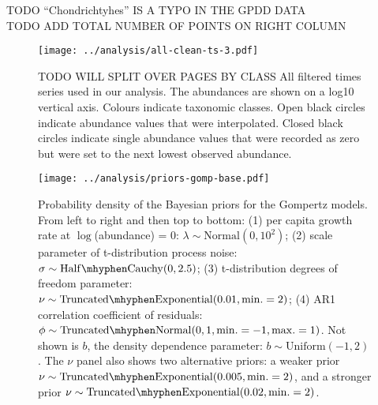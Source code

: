 
\clearpage
\renewcommand{\thetable}{S\arabic{table}}
\setcounter{table}{0}
TODO ``Chondrichtyhes'' IS A TYPO IN THE GPDD DATA\\
TODO ADD TOTAL NUMBER OF POINTS ON RIGHT COLUMN

\clearpage


\renewcommand{\thefigure}{S\arabic{figure}}
\setcounter{figure}{0}

\begin{figure}[htbp]
\begin{center}
\texttt{[image: ../analysis/all-clean-ts-3.pdf]}
\caption{
TODO WILL SPLIT OVER PAGES BY CLASS
  All filtered times series used in our analysis. The abundances are shown on
  a log10 vertical axis. Colours indicate taxonomic classes. Open black circles
  indicate abundance values that were interpolated. Closed black circles
  indicate single abundance values that were recorded as zero but were set to
  the next lowest observed abundance.
}
    \label{fig:all-ts}
\end{center}
\end{figure}

\clearpage

\begin{figure}[htbp]
\begin{center}
\texttt{[image: ../analysis/priors-gomp-base.pdf]}
\caption{
  Probability density of the Bayesian priors for the Gompertz models. From left to right and then top to bottom: (1) per capita growth rate at $\log$(abundance) = $0$: $\lambda \sim \mathrm{Normal}(0, 10^2)$; (2) scale parameter of t-distribution process noise: $\sigma \sim \mathrm{Half\mhyphen Cauchy} (0, 2.5)$; (3) t-distribution degrees of freedom parameter: $\nu \sim \mathrm{Truncated\mhyphen Exponential}(0.01, \mathrm{min.} = 2)$; (4) AR1 correlation coefficient of residuals: $\phi \sim \mathrm{Truncated \mhyphen Normal}(0, 1, \mathrm{min.} = -1, \mathrm{max.} = 1)$. Not shown is $b$, the density dependence parameter: $b \sim \mathrm{Uniform}(-1, 2)$. The $\nu$ panel also shows two alternative priors: a weaker prior $\nu \sim \mathrm{Truncated\mhyphen Exponential}(0.005, \mathrm{min.} = 2)$, and a stronger prior $\nu \sim \mathrm{Truncated\mhyphen Exponential}(0.02, \mathrm{min.} = 2)$.
}
  \label{fig:priors}
\end{center}
\end{figure}


